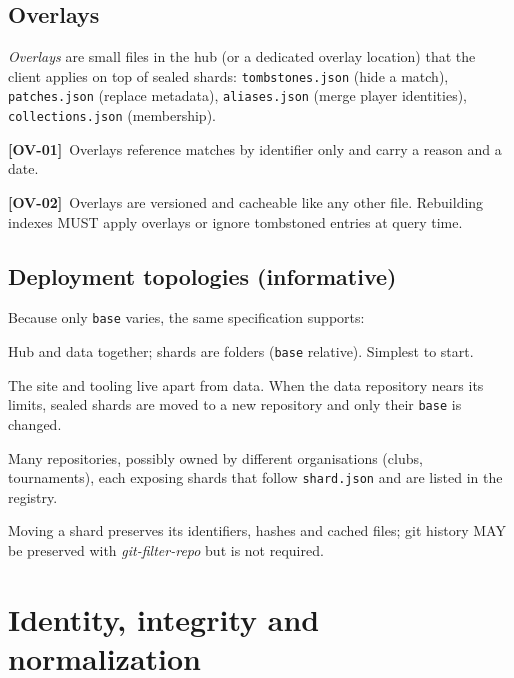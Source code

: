 \documentclass[11pt,a4paper]{article}
\newcommand{\kw}[1]{\textit{#1}\index{#1}}
\newcommand{\req}[2]{\par\smallskip\noindent\hypertarget{#1}{}\textbf{[#1]}\ #2\par}
\begin{document}
\subsection{Overlays}\label{sec:overlays}
\kw{Overlays} are small files in the hub (or a dedicated overlay location) that the client applies on top of sealed shards: \texttt{tombstones.json} (hide a match), \texttt{patches.json} (replace metadata), \texttt{aliases.json} (merge player identities), \texttt{collections.json} (membership).
\req{OV-01}{Overlays reference matches by identifier only and carry a reason and a date.}
\req{OV-02}{Overlays are versioned and cacheable like any other file. Rebuilding indexes MUST apply overlays or ignore tombstoned entries at query time.}

\subsection{Deployment topologies (informative)}\label{sec:topologies}
Because only \texttt{base} varies, the same specification supports:
\begin{description}[leftmargin=0.6cm]
  \item[T1 -- Single repository.] Hub and data together; shards are folders (\texttt{base} relative). Simplest to start.
  \item[T2 -- Hub plus one data repository (recommended).] The site and tooling live apart from data. When the data repository nears its limits, sealed shards are moved to a new repository and only their \texttt{base} is changed.
  \item[T3 -- Federation.] Many repositories, possibly owned by different organisations (clubs, tournaments), each exposing shards that follow \texttt{shard.json} and are listed in the registry.
\end{description}
Moving a shard preserves its identifiers, hashes and cached files; git history MAY be preserved with \kw{git-filter-repo} but is not required.

\section{Identity, integrity and normalization}\label{sec:identity}
\end{document}
